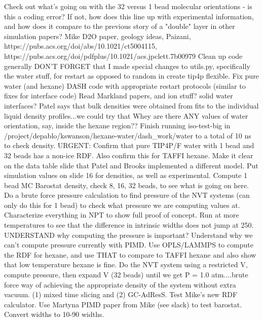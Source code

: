 \documentclass[12pt,reqno]{amsart}
\numberwithin{equation}{section}
\begin{document}
\begin{enumerate}
\subitem Check out what's going on with the 32 versus 1 bead molecular orientations - is this a coding error?  If not, how does this line up with experimental information, and how does it compare to the previous story of a "double" layer in other simulation papers?  
\subitem Mike D2O paper, geology ideas, Paizani, https://pubs.acs.org/doi/abs/10.1021/ct5004115, https://pubs.acs.org/doi/pdfplus/10.1021/acs.jpclett.7b00979
\subitem Clean up code generally 
\subitem DON'T FORGET that I made special changes to utils.py, specifically the water stuff, for restart as opposed to random in create tip4p flexible.  
\subitem Fix pure water (and hexane) DASH code with appropriate restart protocols (similar to fixes for interface code)
\subitem Read Markland papers, and ion stuff?  solid water interfaces?
\subitem Patel says that bulk densities were obtained from fits to the individual liquid density profiles...we could try that
\subitem Whey are there ANY values of water orientation, say, inside the hexane region??
\subitem Finish running iso-test-big in /project/depablo/kswanson/hexane-water/dash\_work/water to a total of 10 ns to check density.  
\subitem URGENT: Confirm that pure TIP4P/F water with 1 bead and 32 beads has a non-ice RDF.  Also confirm this for TAFFI hexane.  Make it clear on the data table slide that Patel and Brooks implemented a different model.  Put simulation values on slide 16 for densities, as well as experimental.  Compute 1 bead MC Barostat density, check 8, 16, 32 beads, to see what is going on here.  Do a brute force pressure calculation to find pressure of the NVT systems (can only do this for 1 bead) to check what pressure we are computing values at.  Characterize everything in NPT to show full proof of concept.  Run at more temperatures to see that the difference in intrinsic widths does not jump at 250.  UNDERSTAND why computing the pressure is important?  Understand why we can't compute pressure currently with PIMD.  Use OPLS/LAMMPS to compute the RDF for hexane, and use THAT to compare to TAFFI hexane and also show that low temperature hexane is fine.  Do the NVT system using a restricted V, compute pressure, then expand V (32 beads) until we get P = 1.0 atm....brute force way of achieving the appropriate density of the system without extra vacuum.  (1) mixed time slicing and (2) GC-AdResS.  Test Mike's new RDF calculator.  Use Martyna PIMD paper from Mike (see slack) to test barostat.  Convert widths to 10-90 widths.  


\end{enumerate}
\end{document}
